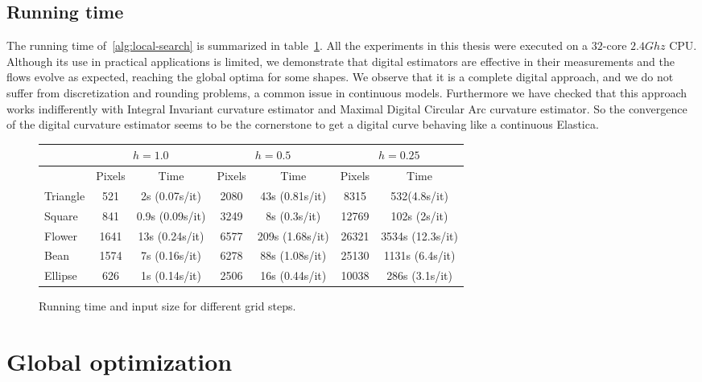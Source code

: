 \subsection{Running time}
\label{ch6:subsec:running-time}

The running time of~\cref{alg:local-search} is summarized in table~\cref{tab:summary-local-comb-rtime}. All the experiments in this thesis were executed on a $32$-core $2.4Ghz$ CPU. Although its use in practical applications is
limited, we demonstrate that digital estimators are effective in their measurements and the flows evolve as expected, reaching the global optima for some shapes. We
observe that it is a complete digital approach, and we do not suffer from discretization and rounding problems, a common
issue in continuous models.  Furthermore we have checked that this approach works indifferently with Integral Invariant
curvature estimator and Maximal Digital Circular Arc curvature estimator. So the convergence of the digital curvature
estimator seems to be the cornerstone to get a digital curve behaving like a continuous Elastica. 

\begin{figure}[h!]
\center
\captionsetup{type=table}
\begin{tabular}{|l|c|c|c|c|c|c|}
\hline
& \multicolumn{2}{c|}{$h=1.0$} & \multicolumn{2}{c|}{$h=0.5$} & \multicolumn{2}{c|}{$h=0.25$}\\
\hline
& Pixels & Time & Pixels & Time & Pixels & Time\\
\hline
Triangle & 521 & 2s (0.07s/it)  & 2080 & 43s (0.81s/it) & 8315 & 532(4.8s/it)\\
Square & 841 & 0.9s (0.09s/it) & 3249 & 8s (0.3s/it) & 12769 & 102s (2s/it)\\
Flower & 1641 & 13s (0.24s/it) & 6577 & 209s (1.68s/it) & 26321 & 3534s (12.3s/it)\\
Bean  & 1574 & 7s (0.16s/it) & 6278 & 88s (1.08s/it) & 25130 & 1131s (6.4s/it)\\
Ellipse  & 626 & 1s (0.14s/it) & 2506 & 16s (0.44s/it) & 10038 & 286s (3.1s/it)\\
\hline
\end{tabular}
\caption{Running time and input size for different grid steps.}
\label{tab:summary-local-comb-rtime} 
\end{figure}





\section{Global optimization}
\label{ch6:sec:global-optimization}

